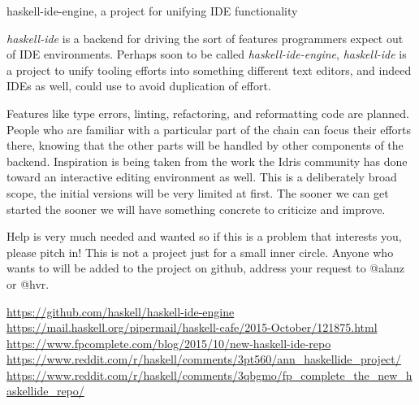 \documentclass[DIV16,twocolumn,10pt]{scrreprt}
\begin{document}
\begin{hcarentry}{haskell-ide-engine, a project for unifying IDE functionality}

\makeheader

\textit{haskell-ide} is a backend for driving the sort of features programmers
expect out of IDE environments. Perhaps soon to be called
\textit{haskell-ide-engine}, \textit{haskell-ide} is a project to unify tooling
efforts into something different text editors, and indeed IDEs as well, could
use to avoid duplication of effort.

Features like type errors, linting, refactoring, and reformatting code are
planned. People who are familiar with a particular part of the chain can
focus their efforts there, knowing that the other parts will be handled by
other components of the backend. Inspiration is being taken from the work the
Idris community has done toward an interactive editing environment as well. This
is a deliberately broad scope, the initial versions will be very limited at
first. The sooner we can get started the sooner we will have something concrete
to criticize and improve.

Help is very much needed and wanted so if this is a problem that interests you,
please pitch in! This is not a project just for a small inner circle. Anyone
who wants to will be added to the project on github, address your request to
@alanz or @hvr.

\FurtherReading
  \url{https://github.com/haskell/haskell-ide-engine} \\
  \url{https://mail.haskell.org/pipermail/haskell-cafe/2015-October/121875.html} \\
  \url{https://www.fpcomplete.com/blog/2015/10/new-haskell-ide-repo} \\
  \url{https://www.reddit.com/r/haskell/comments/3pt560/ann_haskellide_project/} \\
  \url{https://www.reddit.com/r/haskell/comments/3qbgmo/fp_complete_the_new_haskellide_repo/}

\end{hcarentry}
\end{document}
